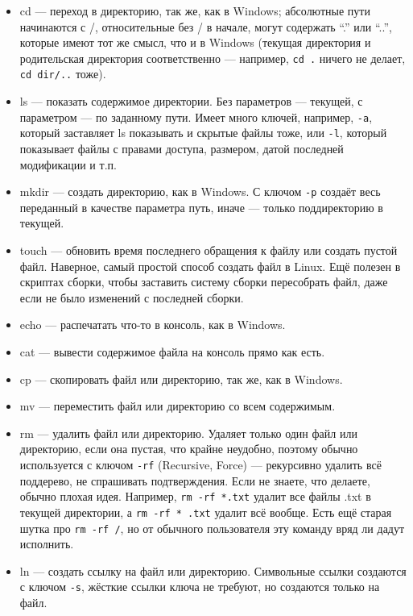 \documentclass{../../text-style}
\begin{document}
\begin{itemize}
    \item cd --- переход в директорию, так же, как в Windows; абсолютные пути начинаются с /, относительные без / в начале, могут содержать \enquote{.} или \enquote{..}, которые имеют тот же смысл, что и в Windows (текущая директория и родительская директория соответственно --- например, \verb|cd .| ничего не делает, \verb|cd dir/..| тоже).
    \item ls --- показать содержимое директории. 
        Без параметров --- текущей, с параметром --- по заданному пути. 
        Имеет много ключей, например, \verb|-a|, который заставляет ls показывать и скрытые файлы тоже, или \verb|-l|, который показывает файлы с правами доступа, размером, датой последней модификации и т.п.
    \item mkdir --- создать директорию, как в Windows.
        С ключом \verb|-p| создаёт весь переданный в качестве параметра путь, иначе --- только поддиректорию в текущей.
    \item touch --- обновить время последнего обращения к файлу или создать пустой файл.
        Наверное, самый простой способ создать файл в Linux.
        Ещё полезен в скриптах сборки, чтобы заставить систему сборки пересобрать файл, даже если не было изменений с последней сборки.
    \item echo --- распечатать что-то в консоль, как в Windows.
    \item cat --- вывести содержимое файла на консоль прямо как есть.
    \item cp --- скопировать файл или директорию, так же, как в Windows.
    \item mv --- переместить файл или директорию со всем содержимым.
    \item rm --- удалить файл или директорию. 
        Удаляет только один файл или директорию, если она пустая, что крайне неудобно, поэтому обычно используется с ключом \verb|-rf| (Recursive, Force) --- рекурсивно удалить всё поддерево, не спрашивать подтверждения.
        Если не знаете, что делаете, обычно плохая идея.
        Например, \verb|rm -rf *.txt| удалит все файлы .txt в текущей директории, а \verb|rm -rf * .txt| удалит всё вообще.
        Есть ещё старая шутка про \verb|rm -rf /|, но от обычного пользователя эту команду вряд ли дадут исполнить.
    \item ln --- создать ссылку на файл или директорию.
        Символьные ссылки создаются с ключом \verb|-s|, жёсткие ссылки ключа не требуют, но создаются только на файл.

\end{itemize}
\end{document}
